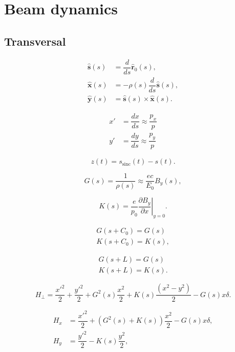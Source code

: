 \chapter{Beam dynamics}

\section{Transversal}

\begin{align}
    \mathbf{\hat{s}}(s) & = \dfrac{d}{ds}\mathbf{\hat{r}}_0 (s), \nonumber \\
     \mathbf{\hat{x}}(s) & = -\rho(s)\dfrac{d}{ds}\mathbf{\hat{s}} (s), \\
      \mathbf{\hat{y}}(s) & = \mathbf{\hat{s}}(s) \times \mathbf{\hat{x}}(s). \nonumber 
\end{align}

\begin{align}
    x' & = \dfrac{dx}{ds} \approx  \dfrac{p_x}{p} \nonumber \\
      y' & = \dfrac{dy}{ds} \approx  \dfrac{p_y}{p} \nonumber
\end{align}

\[
z(t) = s_{\text{sinc}}(t) - s(t).
\]

\begin{equation}
    G(s) = \dfrac{1}{\rho(s)} \approx \dfrac{ec}{E_0}B_{y}(s),
\end{equation}

\begin{equation}
    K(s) = \dfrac{e}{p_0} \left.\dfrac{\partial B_y}{\partial x}\right|_{y=0}.
\end{equation}

\begin{align*}
    G(s+C_0) = G(s) \\
    K(s+C_0) = K(s),
\end{align*}

\begin{align*}
    G(s+L) = G(s) \\
    K(s+L) = K(s).
\end{align*}

\begin{equation}
    H_{\perp} = \dfrac{x'^2}{2} + \dfrac{y'^2}{2} + G^2(s)\dfrac{x^2}{2} + K(s)\dfrac{\left(x^2 - y^2\right)}{2} - G(s) x\delta.
\end{equation}

\begin{align*}
   H_x & =  \dfrac{x'^2}{2}  + \left(G^2(s)+K(s)\right)\dfrac{x^2}{2} - G(s) x\delta, \\
   H_y &= \dfrac{y'^2}{2}  -K(s)\dfrac{y^2}{2},
\end{align*}

